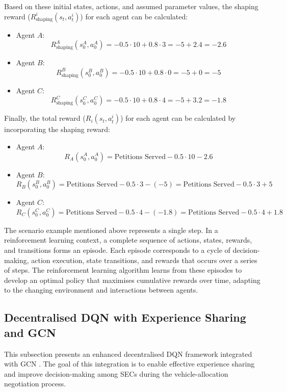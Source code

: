 Based on these initial states, actions, and assumed parameter values, the shaping reward (\(R_{\text{shaping}}^i(s_t, a_t^i)\)) for each agent can be calculated:

\begin{itemize}
    \item Agent \(A\): 
    \[
    R_{\text{shaping}}^A(s_0^A, a_0^A) = -0.5 \cdot 10 + 0.8 \cdot 3 = -5 + 2.4 = -2.6
    \]
    \item Agent \(B\): 
    \[
    R_{\text{shaping}}^B(s_0^B, a_0^B) = -0.5 \cdot 10 + 0.8 \cdot 0 = -5 + 0 = -5
    \]
    \item Agent \(C\): 
    \[
    R_{\text{shaping}}^C(s_0^C, a_0^C) = -0.5 \cdot 10 + 0.8 \cdot 4 = -5 + 3.2 = -1.8
    \]
\end{itemize}

Finally, the total reward (\(R_i(s_t, a_t^i)\)) for each agent can be calculated by incorporating the shaping reward:

\begin{itemize}
    \item Agent \(A\): 
    \[
    R_A(s_0^A, a_0^A) = \text{Petitions Served} - 0.5 \cdot 10 - 2.6
    \]
    \item Agent \(B\): 
    \[
    R_B(s_0^B, a_0^B) = \text{Petitions Served} - 0.5 \cdot 3 - (-5) = \text{Petitions Served} - 0.5 \cdot 3 + 5
    \]
    \item Agent \(C\): 
    \[
    R_C(s_0^C, a_0^C) = \text{Petitions Served} - 0.5 \cdot 4 - (-1.8) = \text{Petitions Served} - 0.5 \cdot 4 + 1.8
    \]
\end{itemize}

The scenario example mentioned above represents a single step. In a reinforcement learning context, a complete sequence of actions, states, rewards, and transitions forms an episode. Each episode corresponds to a cycle of decision-making, action execution, state transitions, and rewards that occurs over a series of steps. The reinforcement learning algorithm learns from these episodes to develop an optimal policy that maximises cumulative rewards over time, adapting to the changing environment and interactions between agents.

\subsection{Decentralised DQN with Experience Sharing and GCN}
\label{sec:decentralised_dqn_gcn}

This subsection presents an enhanced decentralised DQN framework integrated with GCN \cite{Reference106}. The goal of this integration is to enable effective experience sharing and improve decision-making among SECs during the vehicle-allocation negotiation process.

